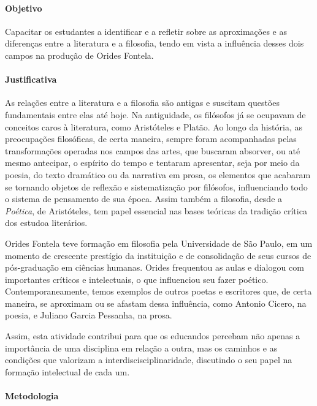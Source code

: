 \documentclass[12pt]{extarticle}
\begin{document}
\paragraph{Objetivo} Capacitar os estudantes a identificar e a refletir
sobre as aproximações e as diferenças entre a literatura e a filosofia,
tendo em vista a influência desses dois campos na produção de Orides
Fontela.

\paragraph{Justificativa} As relações entre a literatura e a filosofia são
antigas e suscitam questões fundamentais entre elas até hoje. Na
antiguidade, os filósofos já se ocupavam de conceitos caros à
literatura, como Aristóteles e Platão. Ao longo da história, as
preocupações filosóficas, de certa maneira, sempre foram acompanhadas
pelas transformações operadas nos campos das artes, que buscaram
absorver, ou até mesmo antecipar, o espírito do tempo e tentaram
apresentar, seja por meio da poesia, do texto dramático ou da narrativa
em prosa, os elementos que acabaram se tornando objetos de reflexão e
sistematização por filósofos, influenciando todo o sistema de pensamento
de sua época. Assim também a filosofia, desde a \emph{Poética}, de
Aristóteles, tem papel essencial nas bases teóricas da tradição crítica
dos estudoa literários.

Orides Fontela teve formação em filosofia pela Universidade de São
Paulo, em um momento de crescente prestígio da instituição e de
consolidação de seus cursos de pós-graduação em ciências humanas. Orides
frequentou as aulas e dialogou com importantes críticos e intelectuais,
o que influenciou seu fazer poético. Contemporaneamente, temos exemplos
de outros poetas e escritores que, de certa maneira, se aproximam ou se
afastam dessa influência, como Antonio Cicero, na poesia, e Juliano
Garcia Pessanha, na prosa.

Assim, esta atividade contribui para que os educandos percebam não
apenas a importância de uma disciplina em relação a outra, mas os
caminhos e as condições que valorizam a interdiscisciplinaridade,
discutindo o seu papel na formação intelectual de cada um.

\paragraph{Metodologia} 
\end{document}
